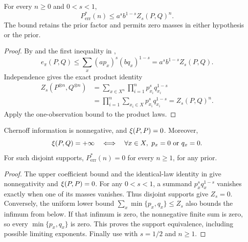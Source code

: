 \begin{theorem}
\label{thm:chernoff-finite}
For every $n\ge0$ and $0<s<1$,
\[
 P_{\mathrm{err}}^*(n)\le a^s b^{1-s}Z_s(P,Q)^n.
\]
The bound retains the prior factor and permits zero masses in either
hypothesis or the prior.
\end{theorem}
\begin{proof}
By  and the first inequality in
,
\[
 e_\pi(P,Q)
 \le\sum_x(ap_x)^s(bq_x)^{1-s}
 =a^s b^{1-s}Z_s(P,Q).
\]
Independence gives the exact product identity
\[
 \begin{aligned}
 Z_s(P^{\otimes n},Q^{\otimes n})
 &=\sum_{x\in X^n}\prod_{i=1}^n p_{x_i}^s q_{x_i}^{1-s}\\
 &=\prod_{i=1}^n\sum_{x_i\in X}p_{x_i}^s q_{x_i}^{1-s}
 =Z_s(P,Q)^n.
 \end{aligned}
\]
Apply the one-observation bound to the product laws.
\end{proof}

\begin{proposition}
\label{prop:chernoff-support}
Chernoff information is nonnegative, and
$\xi(P,P)=0$. Moreover,
\[
 \xi(P,Q)=+\infty
 \quad\Longleftrightarrow\quad
 \forall x\in X,\ p_x=0\ \text{or}\ q_x=0.
\]
For such disjoint supports, $P_{\mathrm{err}}^*(n)=0$ for every
$n\ge1$, for any prior.
\end{proposition}
\begin{proof}
The upper coefficient bound and the identical-law identity in
 give nonnegativity and
$\xi(P,P)=0$.
For any $0<s<1$, a summand $p_x^sq_x^{1-s}$ vanishes exactly when
one of its masses vanishes. Thus disjoint supports give $Z_s=0$.
Conversely, the uniform lower bound
$\sum_x\min\{p_x,q_x\}\le Z_s$ also bounds the infimum from below.
If that infimum is zero, the nonnegative finite sum is zero, so every
$\min\{p_x,q_x\}$ is zero. This proves the support equivalence,
including possible limiting exponents. Finally use
 with $s=1/2$ and $n\ge1$.
\end{proof}

